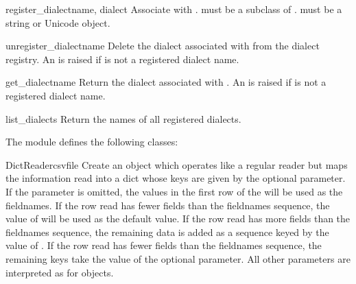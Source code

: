 \begin{funcdesc}{register_dialect}{name, dialect}
Associate  with .   must be a subclass
of .   must be a string or Unicode object.
\end{funcdesc}

\begin{funcdesc}{unregister_dialect}{name}
Delete the dialect associated with  from the dialect registry.  An
 is raised if  is not a registered dialect
name.
\end{funcdesc}

\begin{funcdesc}{get_dialect}{name}
Return the dialect associated with .  An  is
raised if  is not a registered dialect name.
\end{funcdesc}

\begin{funcdesc}{list_dialects}{}
Return the names of all registered dialects.
\end{funcdesc}


The  module defines the following classes:

\begin{classdesc}{DictReader}{csvfile}
Create an object which operates like a regular reader but maps the
information read into a dict whose keys are given by the optional
{} 
parameter.  If the  parameter is omitted, the values in
the first row of the  will be used as the fieldnames.
If the row read has fewer fields than the fieldnames sequence,
the value of  will be used as the default value.  If the row
read has more fields than the fieldnames sequence, the remaining data is
added as a sequence keyed by the value of .  If the row read
has fewer fields than the fieldnames sequence, the remaining keys take the
value of the optional  parameter.  All other parameters are
interpreted as for  objects.
\end{classdesc}


